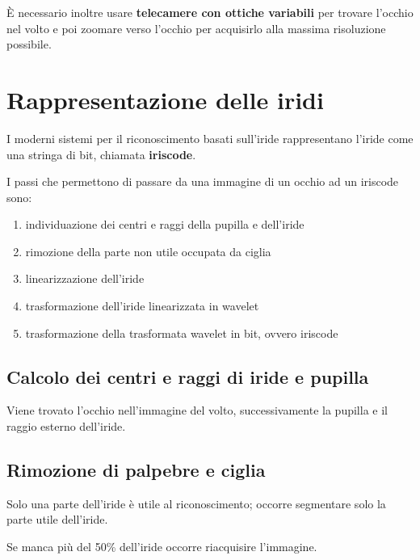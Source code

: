 È necessario inoltre usare \textbf{telecamere con ottiche variabili} per trovare
l'occhio nel volto e poi zoomare verso l'occhio per acquisirlo alla massima
risoluzione possibile.

\section{Rappresentazione delle iridi}
I moderni sistemi per il riconoscimento basati sull'iride rappresentano l'iride come 
una stringa di bit, chiamata \textbf{iriscode}.

I passi che permettono di passare da una immagine di un occhio ad un iriscode sono:
\begin{enumerate}
    \item individuazione dei centri e raggi della pupilla e dell'iride 
    \item rimozione della parte non utile occupata da ciglia 
    \item linearizzazione dell'iride
    \item trasformazione dell'iride linearizzata in wavelet
    \item trasformazione della trasformata wavelet in bit, ovvero iriscode
\end{enumerate}

\subsection{Calcolo dei centri e raggi di iride e pupilla}
Viene trovato l'occhio nell'immagine del volto, successivamente la pupilla 
e il raggio esterno dell'iride.

\subsection{Rimozione di palpebre e ciglia}
Solo una parte dell'iride è utile al riconoscimento; occorre segmentare 
solo la parte utile dell'iride.

Se manca più del 50\% dell'iride occorre riacquisire l'immagine.